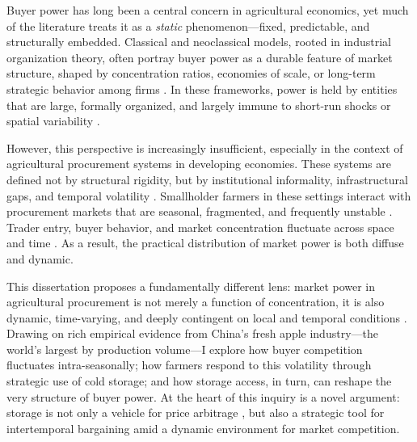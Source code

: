 

\noindent
Buyer power has long been a central concern in agricultural economics, yet much of the literature treats it as a \textit{static} phenomenon---fixed, predictable, and structurally embedded. Classical and neoclassical models, rooted in industrial organization theory, often portray buyer power as a durable feature of market structure, shaped by concentration ratios, economies of scale, or long-term strategic behavior among firms \citep{sexton2013market}. In these frameworks, power is held by entities that are large, formally organized, and largely immune to short-run shocks or spatial variability \citep{sexton2010grocery}.

However, this perspective is increasingly insufficient, especially in the context of agricultural procurement systems in developing economies. These systems are defined not by structural rigidity, but by institutional informality, infrastructural gaps, and temporal volatility \citep{barrett2008agricultural}. Smallholder farmers in these settings interact with procurement markets that are seasonal, fragmented, and frequently unstable \citep{wang2020transaction}. Trader entry, buyer behavior, and market concentration fluctuate across space and time \citep{fafchamps2005selling, sitko2014exploitative, bergquist_dinerstein_2020}. As a result, the practical distribution of market power is both diffuse and dynamic.

This dissertation proposes a fundamentally different lens: market power in agricultural procurement is not merely a function of concentration, it is also dynamic, time-varying, and deeply contingent on local and temporal conditions \citep{barrett2022agri}. Drawing on rich empirical evidence from China's fresh apple industry---the world's largest by production volume---I explore how buyer competition fluctuates intra-seasonally; how farmers respond to this volatility through strategic use of cold storage; and how storage access, in turn, can reshape the very structure of buyer power. At the heart of this inquiry is a novel argument: storage is not only a vehicle for price arbitrage \citep{burke2019sell, wright1982econ}, but also a strategic tool for intertemporal bargaining amid a dynamic environment for market competition.



